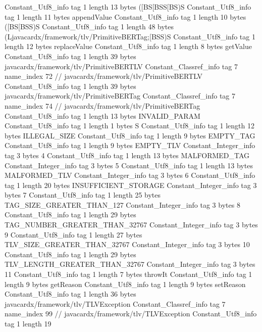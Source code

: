 {{{		}
		Constant_Utf8_info {
			tag	1
			length	13
			bytes	([BS[BSS[BS)S
		}
		Constant_Utf8_info {
			tag	1
			length	11
			bytes	appendValue
		}
		Constant_Utf8_info {
			tag	1
			length	10
			bytes	([BS[BSS)S
		}
		Constant_Utf8_info {
			tag	1
			length	48
			bytes	(Ljavacardx/framework/tlv/PrimitiveBERTag;[BSS)S
		}
		Constant_Utf8_info {
			tag	1
			length	12
			bytes	replaceValue
		}
		Constant_Utf8_info {
			tag	1
			length	8
			bytes	getValue
		}
		Constant_Utf8_info {
			tag	1
			length	39
			bytes	javacardx/framework/tlv/PrimitiveBERTLV
		}
		Constant_Classref_info {
			tag	7
			name_index	72		// javacardx/framework/tlv/PrimitiveBERTLV
		}
		Constant_Utf8_info {
			tag	1
			length	39
			bytes	javacardx/framework/tlv/PrimitiveBERTag
		}
		Constant_Classref_info {
			tag	7
			name_index	74		// javacardx/framework/tlv/PrimitiveBERTag
		}
		Constant_Utf8_info {
			tag	1
			length	13
			bytes	INVALID_PARAM
		}
		Constant_Utf8_info {
			tag	1
			length	1
			bytes	S
		}
		Constant_Utf8_info {
			tag	1
			length	12
			bytes	ILLEGAL_SIZE
		}
		Constant_Utf8_info {
			tag	1
			length	9
			bytes	EMPTY_TAG
		}
		Constant_Utf8_info {
			tag	1
			length	9
			bytes	EMPTY_TLV
		}
		Constant_Integer_info {
			tag	3
			bytes	4
		}
		Constant_Utf8_info {
			tag	1
			length	13
			bytes	MALFORMED_TAG
		}
		Constant_Integer_info {
			tag	3
			bytes	5
		}
		Constant_Utf8_info {
			tag	1
			length	13
			bytes	MALFORMED_TLV
		}
		Constant_Integer_info {
			tag	3
			bytes	6
		}
		Constant_Utf8_info {
			tag	1
			length	20
			bytes	INSUFFICIENT_STORAGE
		}
		Constant_Integer_info {
			tag	3
			bytes	7
		}
		Constant_Utf8_info {
			tag	1
			length	25
			bytes	TAG_SIZE_GREATER_THAN_127
		}
		Constant_Integer_info {
			tag	3
			bytes	8
		}
		Constant_Utf8_info {
			tag	1
			length	29
			bytes	TAG_NUMBER_GREATER_THAN_32767
		}
		Constant_Integer_info {
			tag	3
			bytes	9
		}
		Constant_Utf8_info {
			tag	1
			length	27
			bytes	TLV_SIZE_GREATER_THAN_32767
		}
		Constant_Integer_info {
			tag	3
			bytes	10
		}
		Constant_Utf8_info {
			tag	1
			length	29
			bytes	TLV_LENGTH_GREATER_THAN_32767
		}
		Constant_Integer_info {
			tag	3
			bytes	11
		}
		Constant_Utf8_info {
			tag	1
			length	7
			bytes	throwIt
		}
		Constant_Utf8_info {
			tag	1
			length	9
			bytes	getReason
		}
		Constant_Utf8_info {
			tag	1
			length	9
			bytes	setReason
		}
		Constant_Utf8_info {
			tag	1
			length	36
			bytes	javacardx/framework/tlv/TLVException
		}
		Constant_Classref_info {
			tag	7
			name_index	99		// javacardx/framework/tlv/TLVException
		}
		Constant_Utf8_info {
			tag	1
			length	19
}}}
